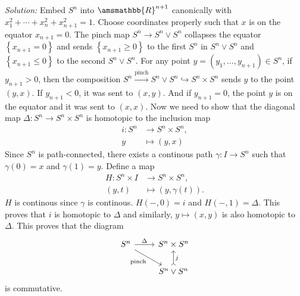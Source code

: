 \documentclass[a4paper, 12pt]{article}
\newenvironment{solution}
    {\textit{Solution:}}
    {}
\renewcommand{\mathbb}{\amsmathbb}
\begin{document}
\begin{solution}
Embed \(S^n\) into \(\mathbb{R}^{n+1}\) canonically with \(x_1^2+\cdots+x_n^2+x_{n+1}^2=1\). Choose coordinates properly such that \(x\) is on the equator \(x_{n+1}=0\). The pinch map \(S^n\rightarrow S^n\vee S^n\) collapses the equator \(\left\{ x_{n+1}=0 \right\}\) and 
sends \(\left\{ x_{n+1}\geq 0 \right\}\) to the first \(S^n\) in \(S^n\vee S^n\) and \(\left\{ x_{n+1}\leq 0 \right\}\) to the second \(S^n\vee S^n\). For any point \(y=(y_1,\ldots,y_{n+1})\in S^n\), if \(y_{n+1}>0\), then the composition 
\(S^n\xrightarrow{\text{pinch}}S^n\vee S^n\hookrightarrow S^n\times S^n\) sends \(y\) to the point \((y,x)\). If \(y_{n+1}<0\), it was sent to \((x,y)\). And if \(y_{n+1}=0\), the point \(y\) is on the equator and it was sent to 
\((x,x)\). Now we need to show that the diagonal map \(\Delta:S^n\rightarrow S^n\times S^n\) is homotopic to the inclusion map 
\begin{align*}
	i:S^n&\rightarrow S^n\times S^n,\\
	  y&\mapsto (y,x) 
\end{align*}
Since \(S^n\) is path-connected, there exists a continous path \(\gamma:I\rightarrow S^n\) such that \(\gamma(0)=x\) and \(\gamma(1)=y\). Define a map 
\begin{align*}
	H:S^n\times I&\rightarrow S^n\times S^n,\\ 
      (y,t)&\mapsto (y,\gamma(t)).
\end{align*}
\(H\) is continous since \(\gamma\) is continous. \(H(-,0)=i\) and \(H(-,1)=\Delta\). This proves that \(i\) is homotopic to \(\Delta\) and similarly, \(y\mapsto (x,y)\) is also homotopic to \(\Delta\). This proves that the diagram 
\[\begin{tikzcd}
	{S^n} & {S^n\times S^n} \\
	& {S^n\vee S^n}
	\arrow["\Delta", from=1-1, to=1-2]
	\arrow["{\text{pinch}}"', from=1-1, to=2-2]
	\arrow["j"', tail, from=2-2, to=1-2]
\end{tikzcd}\]
is commutative.
\end{solution}
\end{document}
